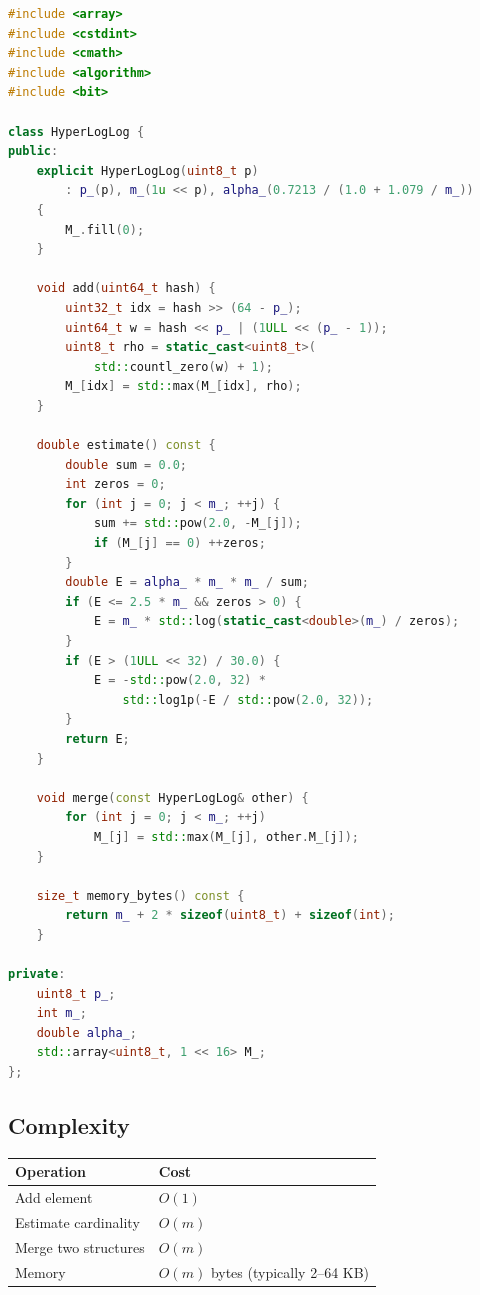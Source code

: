 \begin{lstlisting}[language=C++, caption={HyperLogLog cardinality estimator}]
#include <array>
#include <cstdint>
#include <cmath>
#include <algorithm>
#include <bit>

class HyperLogLog {
public:
    explicit HyperLogLog(uint8_t p)
        : p_(p), m_(1u << p), alpha_(0.7213 / (1.0 + 1.079 / m_))
    {
        M_.fill(0);
    }

    void add(uint64_t hash) {
        uint32_t idx = hash >> (64 - p_);
        uint64_t w = hash << p_ | (1ULL << (p_ - 1));
        uint8_t rho = static_cast<uint8_t>(
            std::countl_zero(w) + 1);
        M_[idx] = std::max(M_[idx], rho);
    }

    double estimate() const {
        double sum = 0.0;
        int zeros = 0;
        for (int j = 0; j < m_; ++j) {
            sum += std::pow(2.0, -M_[j]);
            if (M_[j] == 0) ++zeros;
        }
        double E = alpha_ * m_ * m_ / sum;
        if (E <= 2.5 * m_ && zeros > 0) {
            E = m_ * std::log(static_cast<double>(m_) / zeros);
        }
        if (E > (1ULL << 32) / 30.0) {
            E = -std::pow(2.0, 32) *
                std::log1p(-E / std::pow(2.0, 32));
        }
        return E;
    }

    void merge(const HyperLogLog& other) {
        for (int j = 0; j < m_; ++j)
            M_[j] = std::max(M_[j], other.M_[j]);
    }

    size_t memory_bytes() const {
        return m_ + 2 * sizeof(uint8_t) + sizeof(int);
    }

private:
    uint8_t p_;
    int m_;
    double alpha_;
    std::array<uint8_t, 1 << 16> M_;
};
\end{lstlisting}

\subsection{Complexity}

\begin{center}
\begin{tabular}{ll}
\toprule
Operation & Cost \\
\midrule
Add element & $O(1)$ \\
Estimate cardinality & $O(m)$ \\
Merge two structures & $O(m)$ \\
Memory & $O(m)$ bytes (typically 2--64 KB) \\
\bottomrule
\end{tabular}
\end{center}

